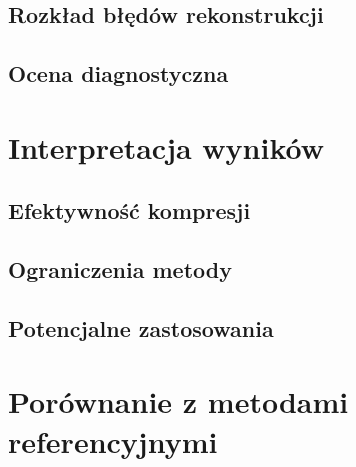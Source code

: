 \documentclass[12pt,a4paper]{article}
\begin{document}

\subsection{Rozkład błędów rekonstrukcji}


\subsection{Ocena diagnostyczna}


\section{Interpretacja wyników}

\subsection{Efektywność kompresji}


\subsection{Ograniczenia metody}


\subsection{Potencjalne zastosowania}


\section{Porównanie z metodami referencyjnymi}
\end{document}
